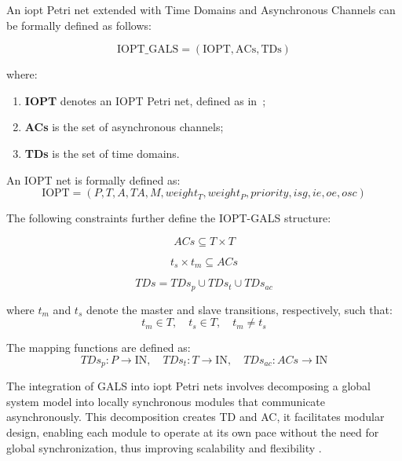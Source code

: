 An \gls{iopt} Petri net extended with Time Domains and Asynchronous Channels can be formally defined as follows:

\begin{equation}
\text{IOPT\_GALS} = (\text{IOPT}, \text{ACs}, \text{TDs})
\end{equation}

where:
\begin{enumerate}
    \item \textbf{IOPT} denotes an IOPT Petri net, defined as in~\cite{iopttools};
    \item \textbf{ACs} is the set of asynchronous channels;
    \item \textbf{TDs} is the set of time domains.
\end{enumerate}

An IOPT net is formally defined as:
\begin{equation}
\text{IOPT} = (P, T, A, TA, M, weight_T, weight_P, priority, isg, ie, oe, osc)
\end{equation}

The following constraints further define the IOPT-GALS structure:

\begin{equation}
ACs \subseteq T \times T
\end{equation}

\begin{equation}
t_s \times t_m \subseteq ACs
\end{equation}

\begin{equation}
TDs = TDs_p \cup TDs_t \cup TDs_{ac}
\end{equation}

\noindent where \( t_m \) and \( t_s \) denote the master and slave transitions, respectively, such that:
\[
t_m \in T, \quad t_s \in T, \quad t_m \neq t_s
\]

\noindent The mapping functions are defined as:
\[
TDs_p : P \rightarrow \text{IN}, \quad TDs_t : T \rightarrow \text{IN}, \quad TDs_{ac} : ACs \rightarrow \text{IN}
\]



The integration of GALS into \gls{iopt} Petri nets involves decomposing a global system model into locally synchronous modules that communicate asynchronously. This decomposition creates TD and AC, it facilitates modular design, enabling each module to operate at its own pace without the need for global synchronization, thus improving scalability and flexibility \cite{galsactd}.




